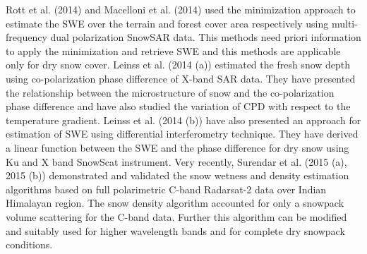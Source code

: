 	
	Rott et al. (2014) and Macelloni et al. (2014) used the minimization approach to estimate the SWE over the terrain and forest cover area respectively using multi-frequency dual polarization SnowSAR data. This methods need priori information to apply the minimization and retrieve SWE and this methods are applicable only for dry snow cover. Leinss et al. (2014 (a)) estimated the fresh snow depth using co-polarization phase difference of X-band SAR data.  They have presented the relationship between the microstructure of snow and the co-polarization phase difference and have also studied the variation of CPD with respect to the temperature gradient.  Leinss et al. (2014 (b)) have also presented an approach for estimation of SWE using differential interferometry technique. They have derived a linear function between the SWE and the phase difference for dry snow using Ku and X band SnowScat instrument. Very recently, Surendar et al. (2015 (a), 2015 (b)) demonstrated and validated the snow wetness and density estimation algorithms based on full polarimetric C-band Radarsat-2 data over Indian Himalayan region. The snow density algorithm accounted for only a snowpack volume scattering for the C-band data. Further this algorithm can be modified and suitably used for higher wavelength bands and for complete dry snowpack conditions. 
	